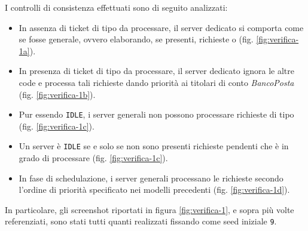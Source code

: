 I controlli di consistenza effettuati sono di seguito analizzati:
\begin{itemize}
\item In assenza di ticket di tipo \sr{} da processare, il server dedicato si comporta come se fosse generale, ovvero elaborando, se presenti, richieste \uo{} o \pp{} (fig. \ref{fig:verifica-1a}).
\item In presenza di ticket di tipo \sr{} da processare, il server dedicato ignora le altre code e processa tali richieste dando priorità ai titolari di conto \textsl{BancoPosta} (fig. \ref{fig:verifica-1b}).
\item Pur essendo \texttt{IDLE}, i server generali non possono processare richieste di tipo \sr{} (fig. \ref{fig:verifica-1c}).
\item Un server è \texttt{IDLE} se e solo se non sono presenti richieste pendenti che è in grado di processare (fig. \ref{fig:verifica-1c}).
\item In fase di schedulazione, i server generali processano le richieste secondo l'ordine di priorità specificato nei modelli precedenti (fig. \ref{fig:verifica-1d}).
\end{itemize}

In particolare, gli screenshot riportati in figura \ref{fig:verifica-1}, e sopra più volte referenziati, sono stati tutti quanti realizzati fissando come seed iniziale \texttt{9}.